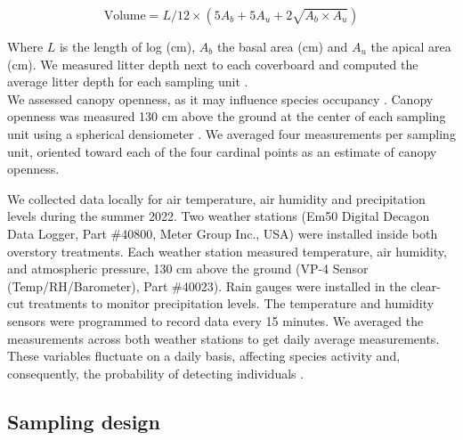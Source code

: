 \begin{equation}
  \text{Volume} = L/12 \times (5A_b + 5A_u + 2\sqrt{A_b \times A_u})
\end{equation}

\vspace{0.5cm}

Where $L$ is the length of log (cm), $A_b$ the basal area (cm) and $A_u$ the apical area (cm).
We measured litter depth next to each coverboard and computed the average litter depth for each sampling unit \citep{Mazerolle2021Woodlandsalamander}. \\

We assessed canopy openness, as it may influence species occupancy \citep{messereForestFloorDistribution1998,koivulaBorealCarabidbeetleColeoptera2002a,tilghmanMetaanalysisEffectsCanopy2012,henneronForestPlantCommunity2017}.
Canopy openness was measured 130 cm above the ground at the center of each sampling unit using a spherical densiometer \citep{lemmonSphericalDensiometerEstimating1956}. 
We averaged four measurements per sampling unit, oriented toward each of the four cardinal points as an estimate of canopy openness.

We collected data locally for air temperature, air humidity and precipitation levels during the summer 2022. 
Two weather stations (Em50 Digital Decagon Data Logger, Part \#40800, Meter Group Inc., USA) were installed inside both overstory treatments. 
Each weather station measured temperature, air humidity, and atmospheric pressure, 130 cm above the ground (VP-4 Sensor (Temp/RH/Barometer), Part \#40023). 
Rain gauges were installed in the clear-cut treatments to monitor precipitation levels. 
The temperature and humidity sensors were programmed to record data every 15 minutes. 
We averaged the measurements across both weather stations to get daily average measurements. 
These variables fluctuate on a daily basis, affecting species activity and, consequently, the probability of detecting individuals \citep{spotilaRoleTemperatureWater1972,butterfieldCarabidLifeCycle1996,loveiEcologyBehaviorGround1996,odonnellPredictingVariationMicrohabitat2014a}.


\subsection*{Sampling design}
\label{subsec:sampling}


